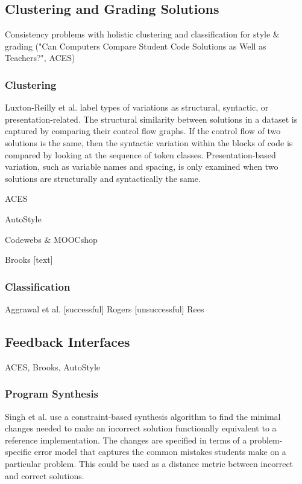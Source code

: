 
\subsection{Clustering and Grading Solutions}

Consistency problems with holistic clustering and classification for style \& grading ("Can Computers Compare Student Code Solutions as Well as Teachers?", ACES)

\subsubsection{Clustering}

Luxton-Reilly et al. \citeyear{Luxton13} label types of variations as structural, syntactic, or presentation-related. The structural similarity between solutions in a dataset is captured by comparing their control flow graphs. If the control flow of two solutions is the same, then the syntactic variation within the blocks of code is compared by looking at the sequence of token classes. Presentation-based variation, such as variable names and spacing, is only examined when two solutions are structurally and syntactically the same.

ACES

AutoStyle

Codewebs \& MOOCshop

Brooks [text]

\subsubsection{Classification}

Aggrawal et al. [successful]
Rogers [unsuccessful]
Rees

\subsection{Feedback Interfaces}
ACES, Brooks, AutoStyle


\subsubsection{Program Synthesis}

Singh et al. \citeyear{rishabh} use a constraint-based synthesis algorithm to find the minimal changes needed to make an incorrect solution functionally equivalent to a reference implementation. The changes are specified in terms of a problem-specific error model that captures the common mistakes students make on a particular problem. This could be used as a distance metric between incorrect and correct solutions.

